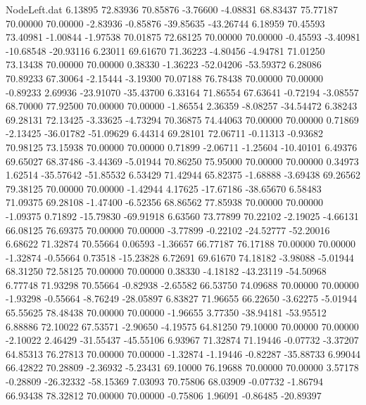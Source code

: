 \begin{filecontents}{NodeLeft.dat}
   6.13895   72.83936   70.85876    -3.76600   -4.08831   68.83437   75.77187   70.00000   70.00000   -2.83936   -0.85876  -39.85635  -43.26744
   6.18959   70.45593   73.40981    -1.00844   -1.97538   70.01875   72.68125   70.00000   70.00000   -0.45593   -3.40981  -10.68548  -20.93116
   6.23011   69.61670   71.36223    -4.80456   -4.94781   71.01250   73.13438   70.00000   70.00000    0.38330   -1.36223  -52.04206  -53.59372
   6.28086   70.89233   67.30064    -2.15444   -3.19300   70.07188   76.78438   70.00000   70.00000   -0.89233    2.69936  -23.91070  -35.43700
   6.33164   71.86554   67.63641    -0.72194   -3.08557   68.70000   77.92500   70.00000   70.00000   -1.86554    2.36359   -8.08257  -34.54472
   6.38243   69.28131   72.13425    -3.33625   -4.73294   70.36875   74.44063   70.00000   70.00000    0.71869   -2.13425  -36.01782  -51.09629
   6.44314   69.28101   72.06711    -0.11313   -0.93682   70.98125   73.15938   70.00000   70.00000    0.71899   -2.06711   -1.25604  -10.40101
   6.49376   69.65027   68.37486    -3.44369   -5.01944   70.86250   75.95000   70.00000   70.00000    0.34973    1.62514  -35.57642  -51.85532
   6.53429   71.42944   65.82375    -1.68888   -3.69438   69.26562   79.38125   70.00000   70.00000   -1.42944    4.17625  -17.67186  -38.65670
   6.58483   71.09375   69.28108    -1.47400   -6.52356   68.86562   77.85938   70.00000   70.00000   -1.09375    0.71892  -15.79830  -69.91918
   6.63560   73.77899   70.22102    -2.19025   -4.66131   66.08125   76.69375   70.00000   70.00000   -3.77899   -0.22102  -24.52777  -52.20016
   6.68622   71.32874   70.55664     0.06593   -1.36657   66.77187   76.17188   70.00000   70.00000   -1.32874   -0.55664    0.73518  -15.23828
   6.72691   69.61670   74.18182    -3.98088   -5.01944   68.31250   72.58125   70.00000   70.00000    0.38330   -4.18182  -43.23119  -54.50968
   6.77748   71.93298   70.55664    -0.82938   -2.65582   66.53750   74.09688   70.00000   70.00000   -1.93298   -0.55664   -8.76249  -28.05897
   6.83827   71.96655   66.22650    -3.62275   -5.01944   65.55625   78.48438   70.00000   70.00000   -1.96655    3.77350  -38.94181  -53.95512
   6.88886   72.10022   67.53571    -2.90650   -4.19575   64.81250   79.10000   70.00000   70.00000   -2.10022    2.46429  -31.55437  -45.55106
   6.93967   71.32874   71.19446    -0.07732   -3.37207   64.85313   76.27813   70.00000   70.00000   -1.32874   -1.19446   -0.82287  -35.88733
   6.99044   66.42822   70.28809    -2.36932   -5.23431   69.10000   76.19688   70.00000   70.00000    3.57178   -0.28809  -26.32332  -58.15369
   7.03093   70.75806   68.03909    -0.07732   -1.86794   66.93438   78.32812   70.00000   70.00000   -0.75806    1.96091   -0.86485  -20.89397

\end{filecontents}
